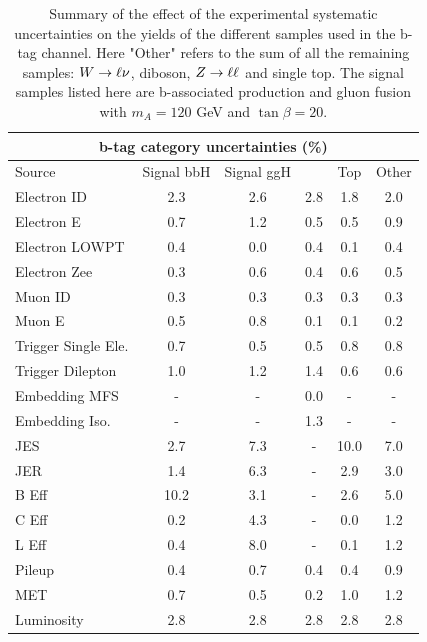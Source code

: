 \begin{table}[tp]
  \centering
  \begin{tabular}{lccccc}
    \hline\hline
      	      		   \multicolumn{6}{c}{ b-tag category uncertainties (\%)}  \\
     \hline
      Source             & Signal bbH 	   & Signal ggH      & \Ztautau      &  Top 	& Other	 \\
    \hline
Electron ID  		 &2.3		   &2.6		     &	2.8          &1.8	&2.0	 \\
Electron E	  	 &0.7		   &1.2		     &0.5	     &0.5	&0.9	 \\
Electron LOWPT	  	 &0.4		   &0.0		     &0.4	     &0.1	&0.4	 \\ 
Electron Zee	  	 &0.3		   &0.6		     &0.4	     &0.6	&0.5	 \\
Muon ID 		 &0.3		   &0.3	   	     &0.3	     &0.3	&0.3	 \\
Muon E		  	 &0.5		   &0.8		     &0.1	     &0.1	&0.2	 \\
Trigger Single	Ele.  	 &0.7		   &0.5		     &0.5	     &0.8	&0.8	 \\
Trigger Dilepton  	 &1.0		   &1.2		     &1.4	     &0.6	&0.6	 \\
Embedding MFS	  	 &-		   &-		     &0.0	     &-		&-	 \\
Embedding Iso.	  	 &-		   &-		     &1.3	     &-		&-	 \\
JES		  	 &2.7		   &7.3		     &-		     &10.0	&7.0	 \\
JER		  	 &1.4		   &6.3		     &-		     &2.9	&3.0	 \\
B Eff		  	 &10.2		   &3.1		     &-		     &2.6	&5.0	 \\
C Eff		  	 &0.2		   &4.3		     &-		     &0.0	&1.2	 \\
L Eff		  	 &0.4		   &8.0		     &-		     &0.1	&1.2	 \\
Pileup			 &0.4		   &0.7		     &0.4	     &0.4	&0.9	 \\
MET 		  	 &0.7		   &0.5 	     &0.2	     &1.0	&1.2	 \\
Luminosity	  	 &2.8 		   &2.8	 	     &2.8 	     &2.8 	&2.8 	 \\

    \hline
    \hline
  \end{tabular}
  \caption{Summary of the effect of the experimental systematic uncertainties on the yields of the different
	samples used  in the b-tag channel. Here "Other" refers to the sum of all the remaining samples: $W\rightarrow \ell \nu$, 
	diboson, $Z\rightarrow \ell \ell$ and single top. The signal samples listed here are b-associated production and gluon 
	fusion with $m_{A}=120$ GeV and $\tan\beta=20$.} 

  \label{tab:ExpSys:btag}
\end{table}


